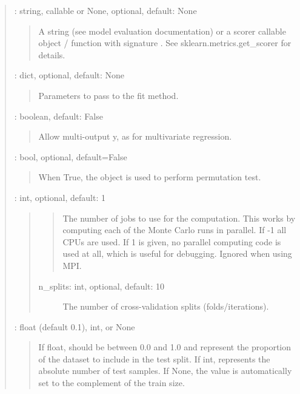 \documentclass[letterpaper,10pt,english]{sphinxmanual}
\begin{document}
\begin{fulllineitems}
\begin{quote}
\begin{description}
 : string, callable or None, optional, default: None
\begin{quote}

A string (see model evaluation documentation) or
a scorer callable object / function with signature
.
See sklearn.metrics.get\_scorer for details.
\end{quote}

 : dict, optional, default: None
\begin{quote}

Parameters to pass to the fit method.
\end{quote}

 : boolean, default: False
\begin{quote}

Allow multi-output y, as for multivariate regression.
\end{quote}

 : bool, optional, default=False
\begin{quote}

When True, the object is used to perform permutation test.
\end{quote}

 : int, optional, default: 1
\begin{quote}
\begin{quote}

The number of jobs to use for the computation. This works by computing
each of the Monte Carlo runs in parallel.
If -1 all CPUs are used. If 1 is given, no parallel computing code is
used at all, which is useful for debugging. Ignored when using MPI.
\end{quote}
\begin{description}
\item[{n\_splits: int, optional, default: 10}] \leavevmode
The number of cross-validation splits (folds/iterations).

\end{description}
\end{quote}

 : float (default 0.1), int, or None
\begin{quote}

If float, should be between 0.0 and 1.0 and represent the
proportion of the dataset to include in the test split. If
int, represents the absolute number of test samples. If None,
the value is automatically set to the complement of the train size.
\end{quote}


\end{description}
\end{quote}
\end{fulllineitems}
\end{document}
